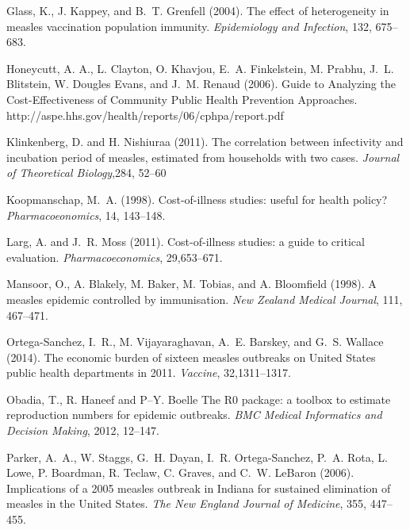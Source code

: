 \documentclass{article}
\begin{document}
\begin{thebibliography}{}
Glass, K., J. Kappey, and B.~T. Grenfell (2004).
\newblock The effect of heterogeneity in measles vaccination population immunity.
\newblock \emph{Epidemiology and Infection}, 132, 675--683.

Honeycutt, A. A., L. Clayton, O. Khavjou, E.~A. Finkelstein, M. Prabhu, J.~L. Blitstein, W. Dougles Evans, and J.~M. Renaud (2006).
\newblock Guide to Analyzing the Cost-Effectiveness of Community Public Health Prevention Approaches.
http://aspe.hhs.gov/health/reports/06/cphpa/report.pdf

Klinkenberg, D. and H. Nishiuraa (2011).
\newblock The correlation between infectivity and incubation period of measles, estimated from households with two cases.
\newblock \emph{Journal of Theoretical Biology},284, 52--60

Koopmanschap, M.~A. (1998).
\newblock Cost-of-illness studies: useful for health policy?
\newblock \emph{Pharmacoeonomics}, 14, 143--148.

Larg, A. and J.~R. Moss (2011).
\newblock Cost-of-illness studies: a guide to critical evaluation.
\newblock \emph{Pharmacoeconomics}, 29,653--671.

Mansoor, O., A. Blakely, M. Baker, M. Tobias, and A. Bloomfield (1998).
\newblock A measles epidemic controlled by immunisation. 
\newblock \emph{New Zealand Medical Journal}, 111, 467--471.

Ortega-Sanchez, I.~R., M. Vijayaraghavan, A.~E. Barskey, and G.~S. Wallace (2014).
\newblock The economic burden of sixteen measles outbreaks on United States public health departments in 2011.
\newblock \emph{Vaccine}, 32,1311--1317.

Obadia, T., R. Haneef and P--Y. Boelle
\newblock The R0 package: a toolbox to estimate reproduction numbers for epidemic outbreaks.
\newblock \emph{BMC Medical Informatics and Decision Making}, 2012, 12--147.

Parker, A.~A., W. Staggs, G.~H. Dayan, I.~R. Ortega-Sanchez, P.~A. Rota, L. Lowe, P. Boardman, R. Teclaw, C. Graves, and C.~W. LeBaron (2006).
\newblock Implications of a 2005 measles outbreak in Indiana for sustained elimination of measles in the United States.
\newblock \emph{The New England Journal of Medicine}, 355, 447--455.


\end{thebibliography}
\end{document}
